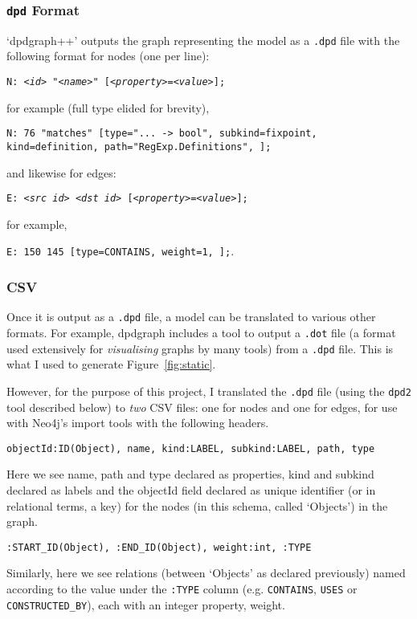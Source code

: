\subsubsection{\texttt{dpd} Format}

`dpdgraph++' outputs the graph representing the model as a \texttt{.dpd} file
with the following format for nodes (one per line):

{\tt N: \emph{<id>} "\emph{<name>}" [\emph{<property>}=\emph{<value>}];}

for example (full type elided for brevity), 

{\tt N: 76 "matches" [type="... -> bool", subkind=fixpoint, kind=definition, path="RegExp.Definitions", ];}

and likewise for edges:

{\tt E: \emph{<src id>} \emph{<dst id>} [\emph{<property>}=\emph{<value>}];}

for example, 

{\tt E: 150 145 [type=CONTAINS, weight=1, ];}.

\subsubsection{CSV}\label{subsubsec:translationcsv}

Once it is output as a \texttt{.dpd} file, a model can be translated to various
other formats. For example, dpdgraph includes a tool to output a \texttt{.dot}
file (a format used extensively for \emph{visualising} graphs by many tools)
from a \texttt{.dpd} file. This is what I used to generate
Figure~\ref{fig:static}.

However, for the purpose of this project, I translated the \texttt{.dpd} file
(using the \texttt{dpd2} tool described below) to \emph{two} CSV files: one for
nodes and one for edges, for use with Neo4j's import tools with the following
headers.

\texttt{objectId:ID(Object), name, kind:LABEL, subkind:LABEL, path, type}

Here we see name, path and type declared as properties, kind and subkind
declared as labels and the objectId field declared as unique identifier (or in
relational terms, a key) for the nodes (in this schema, called `Objects') in
the graph.

\texttt{:START\_ID(Object), :END\_ID(Object), weight:int, :TYPE}

Similarly, here we see relations (between `Objects' as declared
previously) named according to the value under the \texttt{:TYPE} column (e.g.
\texttt{CONTAINS}, \texttt{USES} or \texttt{CONSTRUCTED\_BY}), each with an
integer property, weight.

